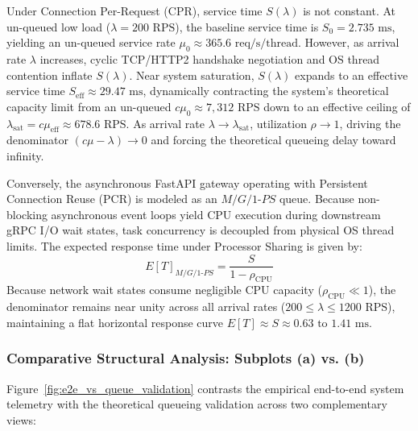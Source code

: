 \documentclass{ieeeaccess}
\begin{document}
Under Connection Per-Request (CPR), service time $S(\lambda)$ is not constant. At un-queued low load ($\lambda = 200\text{ RPS}$), the baseline service time is $S_0 = 2.735\text{ ms}$, yielding an un-queued service rate $\mu_0 \approx 365.6\text{ req/s/thread}$. However, as arrival rate $\lambda$ increases, cyclic TCP/HTTP2 handshake negotiation and OS thread contention inflate $S(\lambda)$. Near system saturation, $S(\lambda)$ expands to an effective service time $S_{\text{eff}} \approx 29.47\text{ ms}$, dynamically contracting the system's theoretical capacity limit from an un-queued $c\mu_0 \approx 7,312\text{ RPS}$ down to an effective ceiling of $\lambda_{\text{sat}} = c\mu_{\text{eff}} \approx 678.6\text{ RPS}$. As arrival rate $\lambda \to \lambda_{\text{sat}}$, utilization $\rho \to 1$, driving the denominator $(c\mu - \lambda) \to 0$ and forcing the theoretical queueing delay toward infinity.

Conversely, the asynchronous FastAPI gateway operating with Persistent Connection Reuse (PCR) is modeled as an $M/G/1\text{-}PS$ queue. Because non-blocking asynchronous event loops yield CPU execution during downstream gRPC I/O wait states, task concurrency is decoupled from physical OS thread limits. The expected response time under Processor Sharing is given by:
\begin{equation}
	E[T]_{M/G/1\text{-}PS} = \frac{S}{1 - \rho_{\text{CPU}}}
\end{equation}
Because network wait states consume negligible CPU capacity ($\rho_{\text{CPU}} \ll 1$), the denominator remains near unity across all arrival rates ($200 \le \lambda \le 1200\text{ RPS}$), maintaining a flat horizontal response curve $E[T] \approx S \approx 0.63\text{ to }1.41\text{ ms}$.

\subsubsection{Comparative Structural Analysis: Subplots (a) vs. (b)}
Figure~\ref{fig:e2e_vs_queue_validation} contrasts the empirical end-to-end system telemetry with the theoretical queueing validation across two complementary views:
\end{document}
